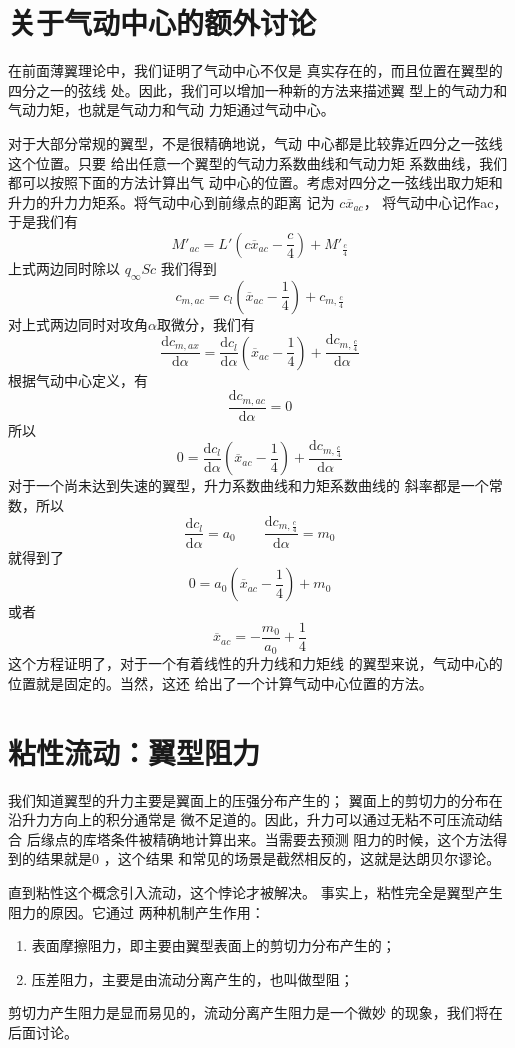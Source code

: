 \section{关于气动中心的额外讨论}
在前面薄翼理论中，我们证明了气动中心不仅是
真实存在的，而且位置在翼型的四分之一的弦线
处。因此，我们可以增加一种新的方法来描述翼
型上的气动力和气动力矩，也就是气动力和气动
力矩通过气动中心。

对于大部分常规的翼型，不是很精确地说，气动
中心都是比较靠近四分之一弦线这个位置。只要
给出任意一个翼型的气动力系数曲线和气动力矩
系数曲线，我们都可以按照下面的方法计算出气
动中心的位置。考虑对四分之一弦线出取力矩和
升力的升力力矩系。将气动中心到前缘点的距离
记为
$c \overline{x}_{ac}$，
将气动中心记作ac，于是我们有
\[
	M'_{ac}=L'\left(c \overline{x}_{ac}-\frac{c}{4}\right)+M'_{\frac{c}{4}}
\]
上式两边同时除以
$q_\infty Sc$
我们得到
\[
	c_{m,ac}=c_l(\overline{x}_{ac}-\frac{1}{4})+c_{m,\frac{c}{4}}
\]
对上式两边同时对攻角$\alpha$取微分，我们有
\[
	\frac{\mathrm{d}c_{m,ax}}{\mathrm{d}\alpha}
	=\frac{\mathrm{d}c_l}{\mathrm{d}\alpha}(\overline{x}_{ac}-\frac{1}{4})
	+\frac{\mathrm{d}c_{m,\frac{c}{4}}}{\mathrm{d}\alpha}
\]
根据气动中心定义，有
\[
	\frac{\mathrm{d}c_{m,ac}}{\mathrm{d}\alpha}=0
\]
所以
\[
	0=\frac{\mathrm{d}c_l}{\mathrm{d}\alpha}(\overline{x}_{ac}-\frac{1}{4})
	+\frac{\mathrm{d}c_{m,\frac{c}{4}}}{\mathrm{d}\alpha}
\]
对于一个尚未达到失速的翼型，升力系数曲线和力矩系数曲线的
斜率都是一个常数，所以
\[
	\frac{\mathrm{d}c_l}{\mathrm{d}\alpha}=a_0 \qquad
	\frac{\mathrm{d}c_{m,\frac{c}{4}}}{\mathrm{d}\alpha}=m_0
\]
就得到了
\[
	0=a_0(\overline{x}_{ac}-\frac{1}{4})+m_0
\]
或者
\[
	\overline{x}_{ac}=-\frac{m_0}{a_0}+\frac{1}{4}
\]
这个方程证明了，对于一个有着线性的升力线和力矩线
的翼型来说，气动中心的位置就是固定的。当然，这还
给出了一个计算气动中心位置的方法。

\section{粘性流动：翼型阻力}
我们知道翼型的升力主要是翼面上的压强分布产生的；
翼面上的剪切力的分布在沿升力方向上的积分通常是
微不足道的。因此，升力可以通过无粘不可压流动结合
后缘点的库塔条件被精确地计算出来。当需要去预测
阻力的时候，这个方法得到的结果就是0 ，这个结果
和常见的场景是截然相反的，这就是达朗贝尔谬论。

直到粘性这个概念引入流动，这个悖论才被解决。
事实上，粘性完全是翼型产生阻力的原因。它通过
两种机制产生作用：
\begin{enumerate}
	\item 表面摩擦阻力，即主要由翼型表面上的剪切力分布产生的；
	\item 压差阻力，主要是由流动分离产生的，也叫做型阻；
\end{enumerate}
剪切力产生阻力是显而易见的，流动分离产生阻力是一个微妙
的现象，我们将在后面讨论。
